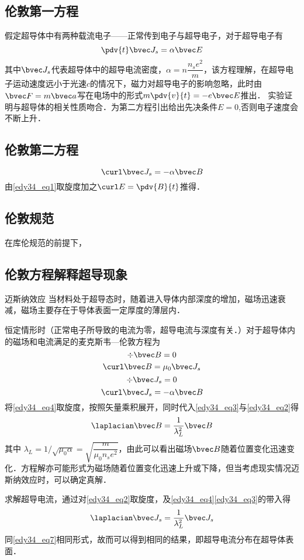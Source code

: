 \subsection{伦敦第一方程}
假定超导体中有两种载流电子——正常传到电子与超导电子，对于超导电子有
\begin{equation}
\pdv{t}\bvec J_s=\alpha\bvec E \label{edy34_eq1}
\end{equation}
其中$\bvec J_s$代表超导体中的超导电流密度，$\alpha=n\dfrac {n_se^2}m$，该方程理解，在超导电子运动速度远小于光速$c$的情况下，磁力对超导电子的影响忽略，此时由$\bvec F=m \bvec a$写在电场中的形式$m\pdv{v}{t}=-e\bvec E$推出．
实验证明与超导体的相关性质吻合．为第二方程引出给出先决条件$E=0$,否则电子速度会不断上升．
\subsection{伦敦第二方程}
\begin{equation}
\curl\bvec J_s=-\alpha\bvec B \label{edy34_eq2}
\end{equation}
由\autoref{edy34_eq1}取旋度加之$\curl E=\pdv{B}{t}$推得．
\subsection{伦敦规范}
在库伦规范的前提下，
\subsection{伦敦方程解释超导现象}
\begin{theorem}{迈斯纳效应}
当材料处于超导态时，随着进入导体内部深度的增加，磁场迅速衰减，磁场主要存在于导体表面一定厚度的薄层内．
\end{theorem}
恒定情形时（正常电子所导致的电流为零，超导电流与深度有关．）对于超导体内的磁场和电流满足的麦克斯韦—伦敦方程为
\begin{equation}
\div \bvec B=0\label{edy34_eq3}
\end{equation}
\begin{equation}
\curl \bvec B=\mu_0 \bvec J_s\label{edy34_eq4}
\end{equation}
\begin{equation}
\div \bvec J_s=0\label{edy34_eq5}
\end{equation}
\begin{equation}
\curl \bvec J_s=-\alpha\bvec B
\end{equation}
将\autoref{edy34_eq4}取旋度，按照矢量乘积展开，同时代入\autoref{edy34_eq3}与\autoref{edy34_eq2}得
\begin{equation}
\laplacian \bvec B=\dfrac{1}{\lambda_L^2}\bvec B \label{edy34_eq7}
\end{equation}
其中 $\lambda_L= 1/\sqrt{\mu_0\alpha}=\sqrt{\dfrac m {\mu_0n_se^2}}$，由此可以看出磁场$\bvec B$随着位置变化迅速变化．方程解亦可能形式为磁场随着位置变化迅速上升或下降，但当考虑现实情况迈斯纳效应时，可以确定真解．

求解超导电流，通过对\autoref{edy34_eq2}取旋度，及\autoref{edy34_eq4}\autoref{edy34_eq3}的带入得
\begin{equation}
\laplacian\bvec J_s=\dfrac 1 {\lambda_L^2}\bvec J_s
\end{equation}
同\autoref{edy34_eq7}相同形式，故而可以得到相同的结果，即超导电流分布在超导体表面．
